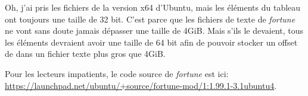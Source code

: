 Oh, j'ai pris les fichiers de la version x64 d'Ubuntu, mais les éléments du tableau
ont toujours une taille de 32 bit.
C'est parce que les fichiers de texte de \emph{fortune} ne vont sans doute jamais dépasser
une taille de 4\ac{GiB}.
Mais s'ils le devaient, tous les éléments devraient avoir une taille de 64 bit afin
de pouvoir stocker un offset de dans un fichier texte plus gros que 4GiB.

Pour les lecteurs impatients, le code source de \emph{fortune} est ici:
\url{https://launchpad.net/ubuntu/+source/fortune-mod/1:1.99.1-3.1ubuntu4}.

